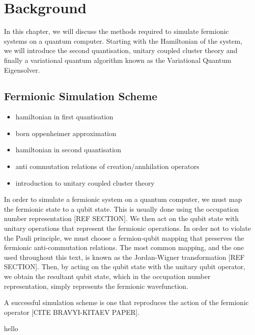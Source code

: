 \chapter{\label{background}Background}
In this chapter, we will discuss the methods required to simulate fermionic systems on a quantum computer. Starting with the Hamiltonian of the system, we will introduce the second quantisation, unitary coupled cluster theory and finally a variational quantum algorithm known as the Variational Quantum Eigensolver.

\section{Fermionic Simulation Scheme}

\begin{itemize}
    \item hamiltonian in first quantisation
    \item born oppenheimer approximation
    \item hamiltonian in second quantisation
    \item anti commutation relations of creation/annhilation operators
    \item introduction to unitary coupled cluster theory
\end{itemize}

In order to simulate a fermionic system on a quantum computer, we must map the fermionic state to a qubit state. This is usually done using the occupation number representation [REF SECTION]. We then act on the qubit state with unitary operations that represent the fermionic operations. In order not to violate the Pauli principle, we must choose a fermion-qubit mapping that preserves the fermionic anti-commutation relations. The most common mapping, and the one used throughout this text, is known as the Jordan-Wigner transformation [REF SECTION]. Then, by acting on the qubit state with the unitary qubit operator, we obtain the resultant qubit state, which in the occupation number representation, simply represents the fermionic wavefunction.

A successful simulation scheme is one that reproduces the action of the fermionic operator [CITE BRAVYI-KITAEV PAPER].

hello

